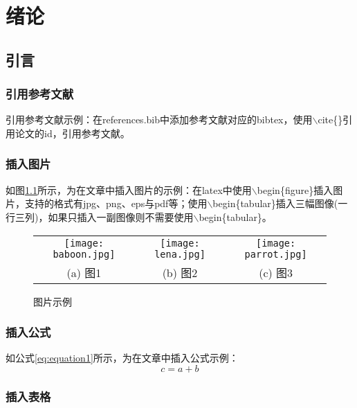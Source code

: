 
\chapter{绪论}

\section{引言}

\subsection{引用参考文献}
引用参考文献示例：在references.bib中添加参考文献对应的bibtex，使用$\backslash$cite\{\}引用论文的id，引用参考文献\cite{barnes2009patchmatch}。

\subsection{插入图片}
如图\ref{fig:figure1}所示，为在文章中插入图片的示例：在latex中使用$\backslash$begin\{figure\}插入图片，支持的格式有jpg、png、eps与pdf等；使用$\backslash$begin\{tabular\}插入三幅图像(一行三列)，如果只插入一副图像则不需要使用$\backslash$begin\{tabular\}。

\begin{figure}[htb]
	\centering
	\setlength\tabcolsep{3pt}  %
	\vspace{5pt} %
	\begin{tabular}{ccc}
		\texttt{[image: baboon.jpg]} &
		\texttt{[image: lena.jpg]} &
		\texttt{[image: parrot.jpg]} \\
		(a) 图1 & (b) 图2 & (c) 图3 \\[1ex]
	\end{tabular}
	\caption{图片示例}
	\label{fig:figure1}
\end{figure}

\subsection{插入公式}
如公式\eqref{eq:equation1}所示，为在文章中插入公式示例：
\begin{equation}
	c = a + b
	\label{eq:equation1}
\end{equation}

\subsection{插入表格}

